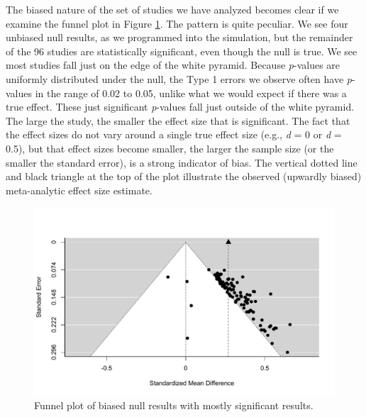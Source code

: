 \documentclass[
  oneside]{book}
\begin{document}
The biased nature of the set of studies we have analyzed becomes clear if we examine the funnel plot in Figure \ref{fig:funnel2}. The pattern is quite peculiar. We see four unbiased null results, as we programmed into the simulation, but the remainder of the 96 studies are statistically significant, even though the null is true. We see most studies fall just on the edge of the white pyramid. Because \emph{p}-values are uniformly distributed under the null, the Type 1 errors we observe often have \emph{p}-values in the range of 0.02 to 0.05, unlike what we would expect if there was a true effect. These just significant \emph{p}-values fall just outside of the white pyramid. The large the study, the smaller the effect size that is significant. The fact that the effect sizes do not vary around a single true effect size (e.g., \emph{d} = 0 or \emph{d} = 0.5), but that effect sizes become smaller, the larger the sample size (or the smaller the standard error), is a strong indicator of bias. The vertical dotted line and black triangle at the top of the plot illustrate the observed (upwardly biased) meta-analytic effect size estimate.

\begin{figure}

{\centering \includegraphics[width=1\linewidth]{12-bias_files/figure-latex/funnel2-1} 

}

\caption{Funnel plot of biased null results with mostly significant results.}\label{fig:funnel2}
\end{figure}
\end{document}
